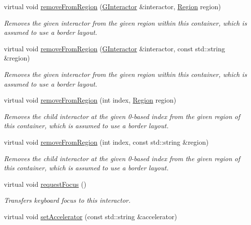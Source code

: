 \begin{DoxyCompactItemize}
virtual void \mbox{\hyperlink{classGContainer_afee7b65f917c4f6a0fdb1c8ea75406a5}{remove\+From\+Region}} (\mbox{\hyperlink{classGInteractor}{G\+Interactor}} \&interactor, \mbox{\hyperlink{classGContainer_a81a01a86de31071a92e6cce0bab9bc4b}{Region}} region)
\begin{DoxyCompactList}\small\item\em Removes the given interactor from the given region within this container, which is assumed to use a border layout. \end{DoxyCompactList}\item 
virtual void \mbox{\hyperlink{classGContainer_af7a055c83c0e0e3f3722596d7111fcbe}{remove\+From\+Region}} (\mbox{\hyperlink{classGInteractor}{G\+Interactor}} \&interactor, const std\+::string \&region)
\begin{DoxyCompactList}\small\item\em Removes the given interactor from the given region within this container, which is assumed to use a border layout. \end{DoxyCompactList}\item 
virtual void \mbox{\hyperlink{classGContainer_a15e3a1d3f3abecc00d68d6df2349f360}{remove\+From\+Region}} (int index, \mbox{\hyperlink{classGContainer_a81a01a86de31071a92e6cce0bab9bc4b}{Region}} region)
\begin{DoxyCompactList}\small\item\em Removes the child interactor at the given 0-\/based index from the given region of this container, which is assumed to use a border layout. \end{DoxyCompactList}\item 
virtual void \mbox{\hyperlink{classGContainer_ac839e32fec6ea6b37f6c6da8aa6ce43b}{remove\+From\+Region}} (int index, const std\+::string \&region)
\begin{DoxyCompactList}\small\item\em Removes the child interactor at the given 0-\/based index from the given region of this container, which is assumed to use a border layout. \end{DoxyCompactList}\item 
virtual void \mbox{\hyperlink{classGInteractor_a519fb2ac767f8b2febbb50b898b8c8cb}{request\+Focus}} ()
\begin{DoxyCompactList}\small\item\em Transfers keyboard focus to this interactor. \end{DoxyCompactList}\item 
virtual void \mbox{\hyperlink{classGInteractor_ad15f102f62e2960576012f1aa0ba4b2e}{set\+Accelerator}} (const std\+::string \&accelerator)

\end{DoxyCompactItemize}
